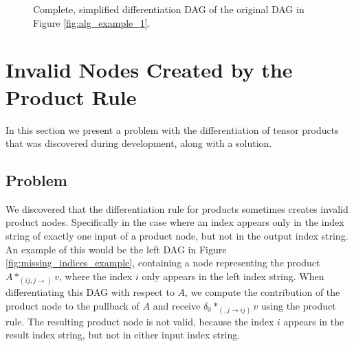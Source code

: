 \documentclass[12pt, a4paper]{report}
\begin{document}
\begin{figure}
    \centering
    \caption[Simplified Differentiation DAG in Example of Multiple Pullback Contributions]{Complete, simplified differentiation DAG of the original DAG in Figure \ref{fig:alg_example_1}.}
    \label{fig:alg_example_3}
\end{figure}

\FloatBarrier
\section{Invalid Nodes Created by the Product Rule}
In this section we present a problem with the differentiation of tensor products that was discovered during development, along with a solution.

\subsection{Problem}
We discovered that the differentiation rule for products sometimes creates invalid product nodes.
Specifically in the case where an index appears only in the index string of exactly one input of a product node, but not in the output index string.
An example of this would be the left DAG in Figure \ref{fig:missing_indices_example}, containing a node representing the product $A *_{(ij,j \rightarrow )} v$, where the index $i$ only appears in the left index string.
When differentiating this DAG with respect to $A$, we compute the contribution of the product node to the pullback of $A$ and receive $\delta_0 *_{(,j \rightarrow ij)} v$ using the product rule.
The resulting product node is not valid, because the index $i$ appears in the result index string, but not in either input index string.
\end{document}
